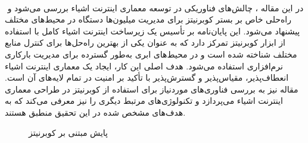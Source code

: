 \paragraph{}{‍
    در این مقاله \cite{Mlynka2022thesis}، چالش‌های فناوریکی در توسعه معماری اینترنت اشیاء بررسی می‌شود و راه‌حلی خاص بر بستر کوبرنیتز برای مدیریت میلیون‌ها دستگاه در محیط‌های مختلف پیشنهاد می‌شود. این پایان‌نامه بر تأسیس یک زیرساخت اینترنت اشیاء کامل با استفاده از ابزار کوبرنیتز تمرکز دارد که به عنوان یکی از بهترین راه‌حل‌ها برای کنترل منابع مختلف شناخته شده است و در محیط‌های ابری به‌طور گسترده برای مدیریت بارکاری نرم‌افزاری استفاده می‌شود. هدف اصلی این کار، ایجاد یک معماری اینترنت اشیاء انعطاف‌پذیر، مقیاس‌پذیر و گسترش‌پذیر با تأکید بر امنیت در تمام لایه‌های آن است. مقاله نیز به بررسی فناوری‌های موردنیاز برای استفاده از کوبرنیتز در طراحی معماری اینترنت اشیاء می‌پردازد و تکنولوژی‌های مرتبط دیگری را نیز معرفی می‌کند که به هدف‌های مشخص شده در این تحقیق منطبق هستند.
    \begin{figure}[H]
        \caption{پایش مبتنی بر کوبرنیتز \cite{Mlynka2022thesis}}
        \label{fig:iot_monitoring}
    \end{figure}
‍}